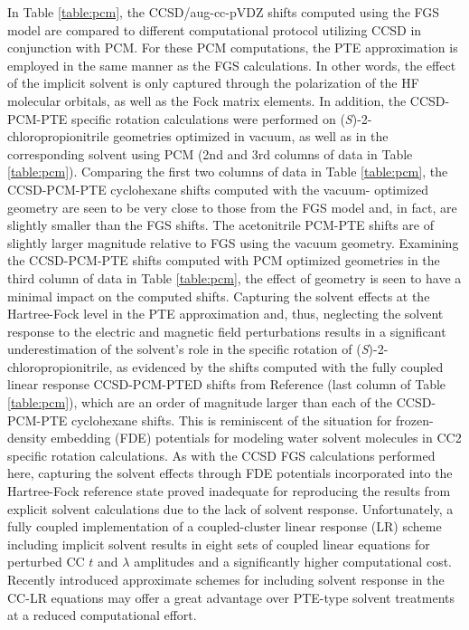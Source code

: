 In Table \ref{table:pcm}, the CCSD/aug-cc-pVDZ shifts computed using the
FGS model are compared to different computational protocol utilizing CCSD
in conjunction with PCM. For these PCM computations, the PTE approximation
is employed in the same manner as the FGS calculations. In other words, the
effect of the implicit solvent is only captured through the polarization of the
HF molecular orbitals, as well as the Fock matrix elements. In addition,
the CCSD-PCM-PTE specific rotation calculations were performed on 
(\emph{S})-2-chloropropionitrile geometries optimized in vacuum, as well as
in the corresponding solvent using PCM (2nd and 3rd columns of data in
Table \ref{table:pcm}). Comparing the first two columns of data in
Table \ref{table:pcm}, the CCSD-PCM-PTE cyclohexane shifts computed with the vacuum-
optimized geometry are seen to be very close
to those from the FGS model and, in fact, are slightly smaller than the
FGS shifts. The acetonitrile PCM-PTE shifts are of slightly
larger magnitude relative to FGS using the vacuum geometry. Examining
the CCSD-PCM-PTE shifts computed with PCM optimized geometries in the third
column of data in Table \ref{table:pcm}, the effect of geometry is seen to
have a minimal impact on the computed shifts. Capturing the solvent
effects at the Hartree-Fock level in the PTE approximation and, thus,
neglecting the solvent response to the electric and magnetic field
perturbations results in a significant underestimation of the solvent's role
in the specific rotation of (\emph{S})-2-chloropropionitrile, as evidenced by
the shifts computed with the fully coupled linear response CCSD-PCM-PTED
shifts from Reference  (last column of Table \ref{table:pcm}),
which are an order of magnitude larger than each of the CCSD-PCM-PTE cyclohexane
shifts. This is reminiscent of the situation for frozen-density embedding
(FDE) potentials for modeling water solvent molecules in CC2 specific rotation calculations.\cite{Crawford:15}
As with the CCSD FGS calculations performed here, capturing the solvent
effects through FDE potentials incorporated into the Hartree-Fock reference state
proved inadequate for reproducing the results from explicit solvent calculations
due to the lack of solvent response. Unfortunately, a fully coupled implementation of
a coupled-cluster linear response (LR) scheme including implicit solvent results
in eight sets of coupled linear equations for perturbed CC $t$ and
$\lambda$ amplitudes and a significantly higher computational cost. Recently
introduced approximate schemes\cite{Caricato:18} for including solvent
response in the CC-LR
equations may offer a great advantage over PTE-type solvent treatments
at a reduced computational effort.\cite{Caricato:18}





